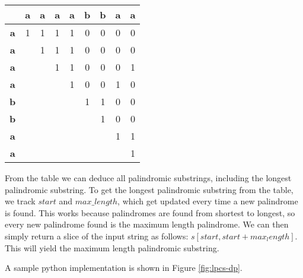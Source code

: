 \begin{table}[htbp]
    \centering
    \begin{tabular}{|c|c|c|c|c|c|c|c|c|}
        \hline
          & \textbf{a} & \textbf{a} & \textbf{a} & \textbf{a} & \textbf{b} & \textbf{b} & \textbf{a} & \textbf{a} \\
        \hline
        \textbf{a} & 1 & 1 & 1 & 1 & 0 & 0 & 0 & 0 \\
        \hline
        \textbf{a} &  & 1 & 1 & 1 & 0 & 0 & 0 & 0 \\
        \hline
        \textbf{a} &  &  & 1 & 1 & 0 & 0 & 0 & 1 \\
        \hline
        \textbf{a} &  &  &  & 1 & 0 & 0 & 1 & 0 \\
        \hline
        \textbf{b} &  &  &  &  & 1 & 1 & 0 & 0 \\
        \hline
        \textbf{b} &  &  &  &  &  & 1 & 0 & 0 \\
        \hline
        \textbf{a} &  &  &  &  &  &  & 1 & 1 \\
        \hline
        \textbf{a} &  &  &  &  &  &  &  & 1 \\
        \hline
    \end{tabular}
\end{table}


From the table we can deduce all palindromic substrings, including the longest palindromic substring.
To get the longest palindromic substring from the table, we track $start$ and $max\_length$, which get updated every time a new palindrome is found.
This works because palindromes are found from shortest to longest, so every new palindrome found is the maximum length palindrome.
We can then simply return a slice of the input string as follows: $s[start,start+max_length]$.
This will yield the maximum length palindromic substring.

A sample python implementation is shown in Figure \ref{fig:lpcs-dp}.

